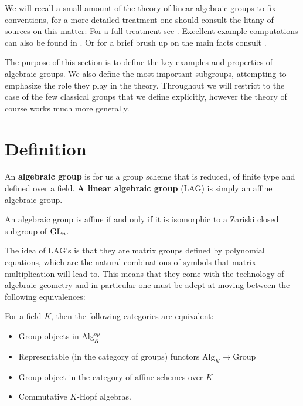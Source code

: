 We will recall a small amount of the theory of linear algebraic groups to fix conventions, for a more detailed treatment one should consult the litany of sources on this matter: For a full treatment see \cite{milneAlgebraicGroupsTheory2017}\cite{milneLieAlgebrasAlgebraic}\cite{milneBasicTheoryAffine}\cite{springerLinearAlgebraicGroups1998}. Excellent example computations can also be found in \cite{BuildingsClassicalGroups}\cite{makisumiStructureTheoryReductive}\cite{malleLinearAlgebraicGroups}\cite{NotesClassAlgebraic}. Or for a brief brush up on the main facts consult \cite[I.I.1]{borelAutomorphicFormsRepresentations1979}. 

The purpose of this section is to define the key examples and properties of algebraic groups. We also define the most important subgroups, attempting to emphasize the role they play in the theory. 
Throughout we will restrict to the case of the few classical groups that we define explicitly, however the theory of course works much more generally. 

\section{Definition}
An \textbf{algebraic group} is for us a group scheme that is reduced, of finite type and defined over a field. \textbf{A linear algebraic group} (LAG) is simply an affine algebraic group.

\begin{proposition}
    An algebraic group is affine if and only if it is isomorphic to a Zariski closed subgroup of \(\operatorname{GL}_n\).
\end{proposition}

The idea of LAG's is that they are matrix groups defined by polynomial equations, which are the natural combinations of symbols that matrix multiplication will lead to. This means that they come with the technology of algebraic geometry and in particular one must be adept at moving between the following equivalences:
\begin{Theorem}
    For a field \(K\), then the following categories are equivalent:
    \begin{itemize}
        \item Group objects in \(\mathrm{Alg}_K^{op}\)
        \item Representable (in the category of groups) functors \(\mathrm{Alg}_K \to \mathrm{Group}\)
        \item Group object in the category of affine schemes over \(K\)
        \item Commutative \(K\)-Hopf algebras.
    \end{itemize}
\end{Theorem}

